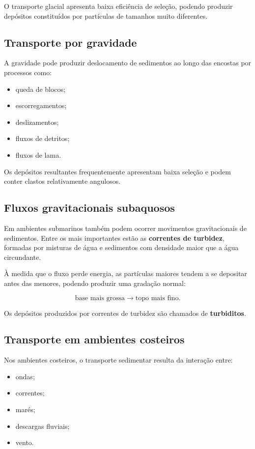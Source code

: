 O transporte glacial apresenta baixa eficiência de seleção, podendo produzir
depósitos constituídos por partículas de tamanhos muito diferentes.

\subsection{Transporte por gravidade}

A gravidade pode produzir deslocamento de sedimentos ao longo das encostas por
processos como:

\begin{itemize}
    \item queda de blocos;
    \item escorregamentos;
    \item deslizamentos;
    \item fluxos de detritos;
    \item fluxos de lama.
\end{itemize}

Os depósitos resultantes frequentemente apresentam baixa seleção e podem conter
clastos relativamente angulosos.

\subsection{Fluxos gravitacionais subaquosos}

Em ambientes submarinos também podem ocorrer movimentos gravitacionais de
sedimentos. Entre os mais importantes estão as \textbf{correntes de turbidez},
formadas por misturas de água e sedimentos com densidade maior que a água
circundante.

À medida que o fluxo perde energia, as partículas maiores tendem a se depositar
antes das menores, podendo produzir uma gradação normal:

\[
\text{base mais grossa}
\rightarrow
\text{topo mais fino}.
\]

Os depósitos produzidos por correntes de turbidez são chamados de
\textbf{turbiditos}.

\subsection{Transporte em ambientes costeiros}

Nos ambientes costeiros, o transporte sedimentar resulta da interação entre:

\begin{itemize}
    \item ondas;
    \item correntes;
    \item marés;
    \item descargas fluviais;
    \item vento.
\end{itemize}

